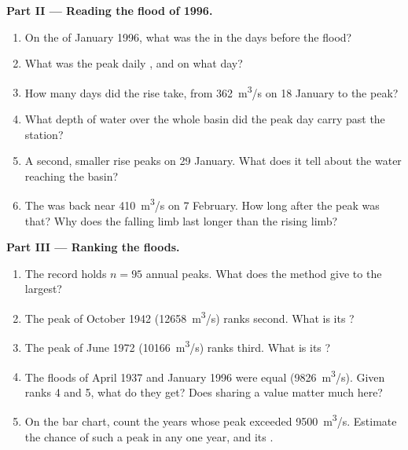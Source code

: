 \begin{problem}
\medskip
\noindent\textbf{Part II --- Reading the flood of 1996.}
\begin{enumerate}[resume]
  \item On the  of January 1996, what was the  in the
        days before the flood?
  \item What was the peak daily , and on what day?
  \item How many days did the rise take, from \qty{362}{m^3/s} on
        18 January to the peak?
  \item What depth of water over the whole basin did the peak day carry
        past the station?
  \item A second, smaller rise peaks on 29 January. What does it tell about
        the water reaching the basin?
  \item The  was back near \qty{410}{m^3/s} on 7 February. How
        long after the peak was that? Why does the falling limb last longer
        than the rising limb?
\end{enumerate}

\medskip
\noindent\textbf{Part III --- Ranking the floods.}
\begin{enumerate}[resume]
  \item The record holds $n = 95$ annual peaks. What  does the
        method give to the largest?
  \item The peak of October 1942 (\qty{12658}{m^3/s}) ranks second. What is
        its ?
  \item The peak of June 1972 (\qty{10166}{m^3/s}) ranks third. What is its
        ?
  \item The floods of April 1937 and January 1996 were equal
        (\qty{9826}{m^3/s}). Given ranks 4 and 5, what  do they
        get? Does sharing a value matter much here?
  \item On the bar chart, count the years whose peak exceeded
        \qty{9500}{m^3/s}. Estimate the chance of such a peak in any one
        year, and its .
\end{enumerate}


\end{problem}

